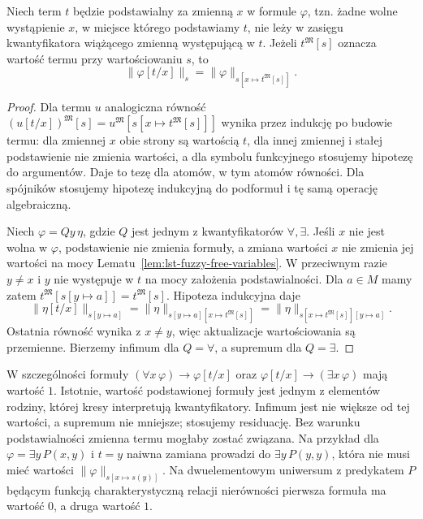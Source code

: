 \begin{lemat}\label{lem:ncl-substitution}
Niech term $t$ będzie podstawialny za zmienną $x$ w
formule $\varphi$, tzn. żadne wolne wystąpienie $x$,
w miejsce którego podstawiamy $t$, nie leży w zasięgu
kwantyfikatora wiążącego zmienną występującą w $t$.
Jeżeli $t^{\mathfrak M}[s]$ oznacza wartość termu przy
wartościowaniu $s$, to
\[
 \|\varphi[t/x]\|_s
 =\|\varphi\|_{s[x\mapsto t^{\mathfrak M}[s]]}.
\]
\end{lemat}
\begin{proof}
Dla termu $u$ analogiczna równość
$(u[t/x])^{\mathfrak M}[s]
=u^{\mathfrak M}[s[x\mapsto t^{\mathfrak M}[s]]]$
wynika przez indukcję po budowie termu: dla zmiennej
$x$ obie strony są wartością $t$, dla innej zmiennej
i stałej podstawienie nie zmienia wartości, a dla
symbolu funkcyjnego stosujemy hipotezę do argumentów.
Daje to tezę dla atomów, w tym atomów równości.
Dla spójników stosujemy hipotezę indukcyjną do
podformuł i tę samą operację algebraiczną.

Niech $\varphi=Qy\,\eta$, gdzie $Q$ jest jednym z
kwantyfikatorów $\forall,\exists$. Jeśli $x$ nie jest
wolna w $\varphi$, podstawienie nie zmienia formuły,
a zmiana wartości $x$ nie zmienia jej wartości
na mocy Lematu~\ref{lem:lst-fuzzy-free-variables}.
W przeciwnym razie $y\ne x$ i $y$ nie występuje w $t$
na mocy założenia podstawialności. Dla $a\in M$
mamy zatem $t^{\mathfrak M}[s[y\mapsto a]]
=t^{\mathfrak M}[s]$. Hipoteza indukcyjna daje
\[
 \|\eta[t/x]\|_{s[y\mapsto a]}
 =\|\eta\|_{s[y\mapsto a][x\mapsto t^{\mathfrak M}[s]]}
 =\|\eta\|_{s[x\mapsto t^{\mathfrak M}[s]][y\mapsto a]}.
\]
Ostatnia równość wynika z $x\ne y$, więc aktualizacje
wartościowania są przemienne. Bierzemy infimum
dla $Q=\forall$, a supremum dla $Q=\exists$.
\end{proof}
W szczególności formuły
$(\forall x\,\varphi)\to\varphi[t/x]$ oraz
$\varphi[t/x]\to(\exists x\,\varphi)$ mają wartość $1$.
Istotnie, wartość podstawionej formuły jest jednym
z elementów rodziny, której kresy interpretują
kwantyfikatory. Infimum jest nie większe od tej
wartości, a supremum nie mniejsze; stosujemy residuację.
Bez warunku podstawialności zmienna termu mogłaby
zostać związana. Na przykład dla $\varphi=\exists y\,P(x,y)$
i $t=y$ naiwna zamiana prowadzi do $\exists y\,P(y,y)$,
która nie musi mieć wartości $\|\varphi\|_{s[x\mapsto s(y)]}$.
Na dwuelementowym uniwersum z predykatem $P$ będącym
funkcją charakterystyczną relacji nierówności pierwsza
formuła ma wartość $0$, a druga wartość $1$.

